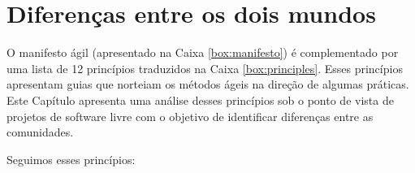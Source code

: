 \chapter{Diferenças entre os dois mundos}
\label{cap:diferencas}

O manifesto ágil (apresentado na Caixa \ref{box:manifesto}) é
complementado por uma lista de 12 princípios traduzidos na Caixa
\ref{box:principles}. Esses princípios apresentam guias que norteiam
os métodos ágeis na direção de algumas práticas. Este Capítulo
apresenta uma análise desses princípios sob o ponto de vista de
projetos de software livre com o objetivo de identificar diferenças
entre as comunidades.

\begin{caixa}[htb]
  \begin{minipage}{\linewidth}
    \centering Seguimos esses princípios:


\end{minipage}
\end{caixa}
